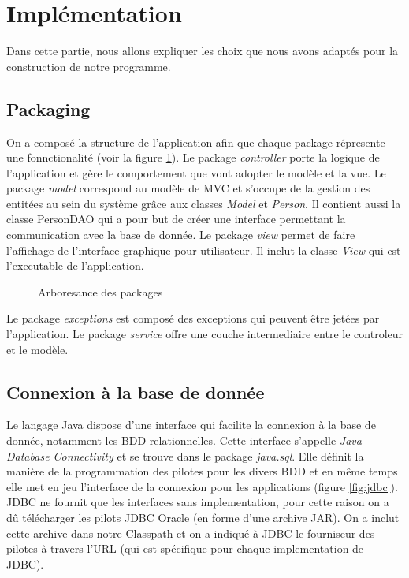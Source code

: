\documentclass[10pt]{article}
\begin{document}
\section{Implémentation}
Dans cette partie, nous allons expliquer les choix que nous avons adaptés pour la construction de notre programme. 
\subsection{Packaging}
On a composé la structure de l'application afin que chaque package répresente une fonnctionalité (voir la figure \ref{fig:packaging}). Le package \textit{controller} porte la logique de l'application et gère le comportement que vont adopter le modèle et la vue. Le package \textit{model} correspond au modèle de MVC et s'occupe de la gestion des entitées au sein du système grâce aux classes \textit{Model} et \textit{Person}. Il contient aussi la classe PersonDAO qui a pour but de créer une interface permettant la communication avec la base de donnée. Le package \textit{view} permet de faire l'affichage de l'interface graphique pour utilisateur. Il inclut la classe \textit{View} qui est l'executable de l'application.

\begin{figure}[ht]
    \centering
    \begin{minipage}{0.9\textwidth}
    \end{minipage}
    \caption{Arboresance des packages}
    \label{fig:packaging}
\end{figure}

Le package \textit{exceptions} est composé des exceptions qui peuvent être jetées par l'application. Le package \textit{service} offre une couche intermediaire entre le controleur et le modèle.

\subsection{Connexion à la base de donnée}
Le langage Java dispose d'une interface qui facilite la connexion à la base de donnée, notamment les BDD relationnelles. Cette interface s'appelle \textit{Java Database Connectivity} et se trouve dans le package \textit{java.sql}. Elle définit la manière de la programmation des pilotes pour les divers BDD et en même temps elle met en jeu l'interface de la connexion pour les applications (figure \ref{fig:jdbc}). JDBC ne fournit que les interfaces sans implementation, pour cette raison on a dû  télécharger les pilots JDBC Oracle (en forme d'une archive JAR). On a inclut cette archive dans notre Classpath et on a indiqué à JDBC le fourniseur des pilotes à travers l'URL (qui est spécifique pour chaque implementation de JDBC).
\end{document}
